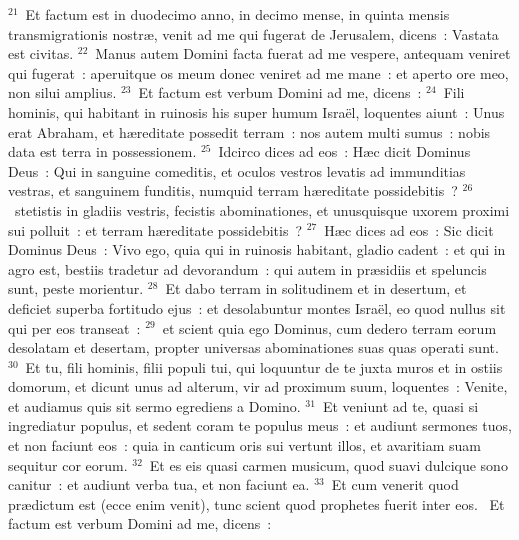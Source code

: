 ${}^{21}$~Et factum est in duodecimo anno, in decimo mense, in quinta mensis transmigrationis nostr\ae , venit ad me qui fugerat de Jerusalem, dicens~: Vastata est civitas.
${}^{22}$~Manus autem Domini facta fuerat ad me vespere, antequam veniret qui fugerat~: aperuitque os meum donec veniret ad me mane~: et aperto ore meo, non silui amplius.
${}^{23}$~Et factum est verbum Domini ad me, dicens~:
${}^{24}$~Fili hominis, qui habitant in ruinosis his super humum Isra\"el, loquentes aiunt~: Unus erat Abraham, et h\ae reditate possedit terram~: nos autem multi sumus~: nobis data est terra in possessionem.
${}^{25}$~Idcirco dices ad eos~: H\ae c dicit Dominus Deus~: Qui in sanguine comeditis, et oculos vestros levatis ad immunditias vestras, et sanguinem funditis, numquid terram h\ae reditate possidebitis~?
${}^{26}$~stetistis in gladiis vestris, fecistis abominationes, et unusquisque uxorem proximi sui polluit~: et terram h\ae reditate possidebitis~?
${}^{27}$~H\ae c dices ad eos~: Sic dicit Dominus Deus~: Vivo ego, quia qui in ruinosis habitant, gladio cadent~: et qui in agro est, bestiis tradetur ad devorandum~: qui autem in pr\ae sidiis et speluncis sunt, peste morientur.
${}^{28}$~Et dabo terram in solitudinem et in desertum, et deficiet superba fortitudo ejus~: et desolabuntur montes Isra\"el, eo quod nullus sit qui per eos transeat~:
${}^{29}$~et scient quia ego Dominus, cum dedero terram eorum desolatam et desertam, propter universas abominationes suas quas operati sunt.
${}^{30}$~Et tu, fili hominis, filii populi tui, qui loquuntur de te juxta muros et in ostiis domorum, et dicunt unus ad alterum, vir ad proximum suum, loquentes~: Venite, et audiamus quis sit sermo egrediens a Domino.
${}^{31}$~Et veniunt ad te, quasi si ingrediatur populus, et sedent coram te populus meus~: et audiunt sermones tuos, et non faciunt eos~: quia in canticum oris sui vertunt illos, et avaritiam suam sequitur cor eorum.
${}^{32}$~Et es eis quasi carmen musicum, quod suavi dulcique sono canitur~: et audiunt verba tua, et non faciunt ea.
${}^{33}$~Et cum venerit quod pr\ae dictum est (ecce enim venit), tunc scient quod prophetes fuerit inter eos.
~Et factum est verbum Domini ad me, dicens~:
